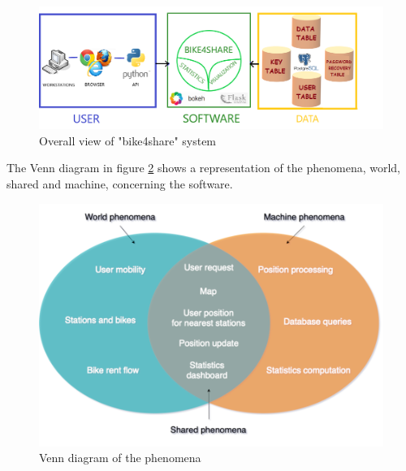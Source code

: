 \documentclass{article}
\begin{document}
\begin{figure}[H]
    \centering
    \includegraphics[width=0.75\linewidth]{image/BIKE4SHARE_SCHEMA_FINAL.png}
    \caption{Overall view of "bike4share" system}
    \label{fig:schema}
\end{figure}
The Venn diagram in figure \ref{fig:venn} shows a representation of the phenomena, world, shared and machine,  concerning the software.\\
\begin{figure}[H]
    \centering
    \includegraphics[width=0.75\linewidth]{image/venn.png}
    \caption{Venn diagram of the phenomena}
    \label{fig:venn}
\end{figure}
\end{document}
